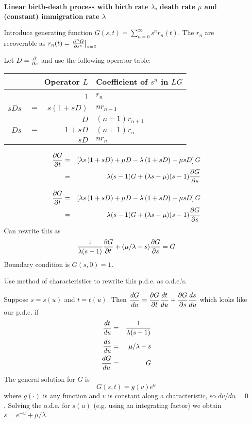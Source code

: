 \documentclass{beamer}
\begin{document}
\begin{frame}{}
{\bf Linear birth-death process with birth rate $\lambda$, death rate $\mu$ and (constant) immigration rate $\lambda$}

 Introduce generating function $G(s,t) = \sum_{n=0}^\infty s^n r_n(t)$.
The $r_n$ are recoverable as $r_n(t) = \left. \frac{\partial^{n} {G}}{\partial {s}^{n}} \right|_{s=0}$

 Let $D = \frac{\partial}{\partial {s}}$ and use the following operator table: %
\begin{tabular}{|rcr|l|}
\hline
\multicolumn{3}{|r|}{Operator $L$}  & Coefficient of $s^n$ in $LG$ \\
\hline
& & 1 & $r_n$ \\
$s D s$ & $=$ & $s \left( 1 + s D \right)$ & $n r_{n-1}$ \\
& & $D$ & $(n+1) r_{n+1}$ \\
$D s$ & $=$ & $1 + s D$ & $(n+1) r_n$ \\
& & $s D$ & $n r_n$ \\
\hline
\end{tabular}
\small
\begin{eqnarray*}
\frac{\partial {G}}{\partial {t}} & = & \left[ \lambda s \left( 1 + s D \right) + \mu D - \lambda \left( 1 + s D \right) - \mu s D \right] G \\
& = & \lambda(s-1) G + (\lambda s - \mu)(s-1) \frac{\partial {G}}{\partial {s}}
\end{eqnarray*}
\normalsize
\end{frame}

\begin{frame}{}
\begin{eqnarray*}
\frac{\partial {G}}{\partial {t}} & = & \left[ \lambda s \left( 1 + s D \right) + \mu D - \lambda \left( 1 + s D \right) - \mu s D \right] G \\
& = & \lambda(s-1) G + (\lambda s - \mu)(s-1) \frac{\partial {G}}{\partial {s}}
\end{eqnarray*}
Can rewrite this as
\[
\frac{1}{\lambda(s-1)} \frac{\partial {G}}{\partial {t}} + (\mu/\lambda - s) \frac{\partial {G}}{\partial {s}} = G
\]
Boundary condition is $G(s,0) = 1$.

\end{frame}

\begin{frame}{}
Use method of characteristics to rewrite this p.d.e. as o.d.e.'s.

Suppose $s=s(u)$ and $t=t(u)$. Then
$\displaystyle
\frac{d {G}}{d {u}} = \frac{\partial {G}}{\partial {t}} \frac{d {t}}{d {u}} + \frac{\partial {G}}{\partial {s}} \frac{d {s}}{d {u}}
$
which looks like our p.d.e. if
\begin{eqnarray*}
\frac{d {t}}{d {u}} & = & \frac{1}{\lambda (s-1)} \\
\frac{d {s}}{d {u}} & = & \mu/\lambda - s \\
\frac{d {G}}{d {u}} & = & G
\end{eqnarray*}
The general solution for $G$ is
\[
G(s,t) = g(v) e^u
\]
where $g(\cdot)$ is any function and $v$ is constant along a characteristic, so $dv/du=0$.
Solving the o.d.e. for $s(u)$ (e.g. using an integrating factor) we obtain
$s = e^{-u} + \mu / \lambda$.
\end{frame}
\end{document}
